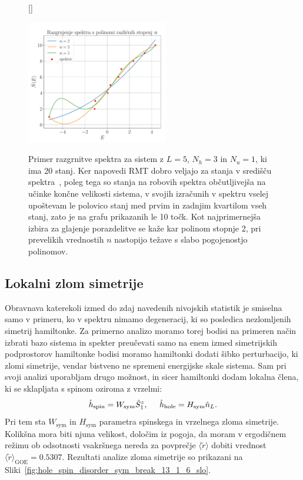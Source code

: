\documentclass[10pt,a4paper]{article}
\begin{document}
\begin{figure}[H]
[\FBwidth]
{\caption{Primer razgrnitve spektra za sistem z $L=5$, $N_h=3$ in $N_u=1$, ki ima 20 stanj. Ker napovedi RMT dobro veljajo za stanja v središču spektra~\cite{d2016quantum}, poleg tega so stanja na robovih spektra občutljivejša na učinke končne velikosti sistema, v svojih izračunih v spektru vselej upoštevam le polovico stanj med prvim in zadnjim kvartilom vseh stanj, zato je na grafu prikazanih le 10 točk. Kot najprimernejša izbira za glajenje porazdelitve se kaže kar polinom stopnje 2, pri prevelikih vrednostih $n$ nastopijo težave s slabo pogojenostjo polinomov. }\label{fig:unfolding_schematics}}
{\includegraphics[width=0.55\textwidth]{unfolding_schematics.pdf}}
\end{figure}
\subsection{Lokalni zlom simetrije}
Obravnava katerekoli izmed do zdaj navedenih nivojskih statistik je smiselna samo v primeru, ko v spektru nimamo degeneracij, ki so posledica nezlomljenih simetrij hamiltonke. Za primerno analizo moramo torej bodisi na primeren način izbrati bazo sistema in spekter preučevati samo na enem izmed simetrijskih podprostorov hamiltonke bodisi moramo hamiltonki dodati šibko perturbacijo, ki zlomi simetrije, vendar bistveno ne spremeni energijske skale sistema. Sam pri svoji analizi uporabljam drugo možnost, in sicer hamiltonki dodam lokalna člena, ki se sklapljata s spinom oziroma z vrzelmi:
\begin{equation}\label{eq:sym_break_terms}
\hat{h}_\mathrm{spin}=W_\mathrm{sym}\hat{S}_1^z, \hspace{5mm} \hat{h}_\mathrm{hole}=H_\mathrm{sym}\hat{n}_L.
\end{equation}
Pri tem sta $W_\mathrm{sym}$ in $H_\mathrm{sym}$ parametra spinskega in vrzelnega zloma simetrije. Kolikšna mora biti njuna velikost, določim iz pogoja, da moram v ergodičnem režimu ob odsotnosti vsakršnega nereda za povprečje $\langle\tilde{r} \rangle$ dobiti vrednost $\langle\tilde{r}\rangle_\mathrm{GOE}=0.5307$. Rezultati analize zloma simetrije so prikazani na Sliki~\ref{fig:hole_spin_disorder_sym_break_13_1_6_slo}.
\end{document}
